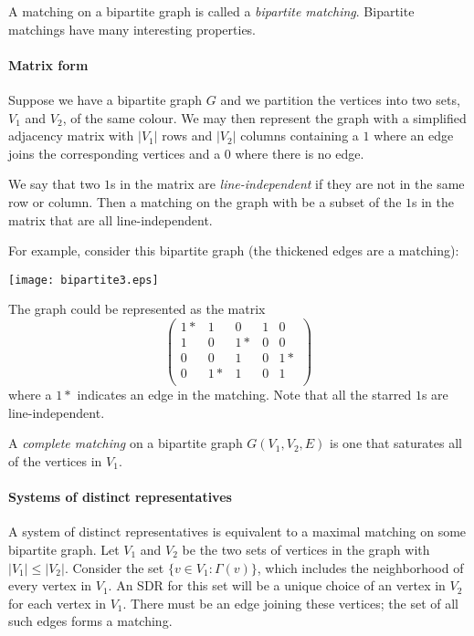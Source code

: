 \documentclass[12pt]{article}
\begin{document}
A matching on a bipartite graph is called a \emph{bipartite matching}.  Bipartite matchings have many interesting properties.

\paragraph{Matrix form}

Suppose we have a bipartite graph $G$ and we partition the vertices into two sets, $V_1$ and $V_2$, of the same colour.  We may then represent the graph with a simplified adjacency matrix with $|V_1|$ rows and $|V_2|$ columns containing a $1$ where an edge joins the corresponding vertices and a $0$ where there is no edge.

We say that two $1$s in the matrix are \emph{line-independent} if they are not in the same row or column.  Then a matching on the graph with be a subset of the $1$s in the matrix that are all line-independent.

For example, consider this bipartite graph (the thickened edges are a matching):

\begin{center}
\texttt{[image: bipartite3.eps]}
\end{center}

The graph could be represented as the matrix
$$\begin{pmatrix}
1* & 1 & 0 & 1 & 0 \\
1 & 0 & 1* & 0 & 0 \\
0 & 0 & 1 & 0 & 1* \\
0 & 1* & 1 & 0 & 1 \\
\end{pmatrix}$$
where a $1*$ indicates an edge in the matching.  Note that all the starred $1$s are line-independent.

A \emph{complete matching} on a bipartite graph $G(V_1, V_2, E)$ is one that saturates all of the vertices in $V_1$.

\paragraph{Systems of distinct representatives}

A system of distinct representatives is equivalent to a maximal matching on some bipartite graph.  Let $V_1$ and $V_2$ be the two sets of vertices in the graph with $|V_1| \leq |V_2|$.  Consider the set $\{ v \in V_1 : \Gamma(v) \}$, which includes the neighborhood of every vertex in $V_1$.  An SDR for this set will be a unique choice of an vertex in $V_2$ for each vertex in $V_1$.  There must be an edge joining these vertices; the set of all such edges forms a matching.
\end{document}
